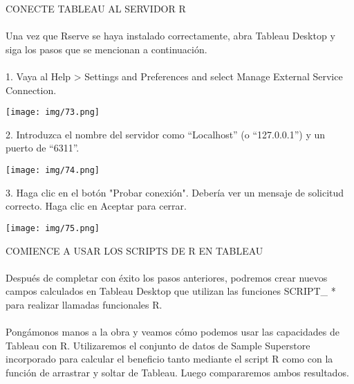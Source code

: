 \documentclass[12pt,letterpaper]{article}
\begin{document}
CONECTE TABLEAU AL SERVIDOR R
\\\\Una vez que Rserve se haya instalado correctamente, abra Tableau Desktop y siga los pasos que se
mencionan a continuación.
\\\\1. Vaya al Help > Settings and Preferences and select Manage External
Service Connection.
\begin{center}
    \texttt{[image: img/73.png]}  
\end{center}
2. Introduzca el nombre del servidor como “Localhost” (o “127.0.0.1”) y un puerto de “6311”.
\begin{center}
    \texttt{[image: img/74.png]}  
\end{center}
3. Haga clic en el botón "Probar conexión". Debería ver un mensaje de solicitud correcto. Haga
clic en Aceptar para cerrar.
\begin{center}
    \texttt{[image: img/75.png]}  
\end{center}

COMIENCE A USAR LOS SCRIPTS DE R EN TABLEAU
\\\\Después de completar con éxito los pasos anteriores, podremos crear nuevos campos calculados en
Tableau Desktop que utilizan las funciones SCRIPT\_ * para realizar llamadas funcionales R.
\\\\Pongámonos manos a la obra y veamos cómo podemos usar las capacidades de Tableau con R.
Utilizaremos el conjunto de datos de Sample Superstore incorporado para calcular el beneficio tanto
mediante el script R como con la función de arrastrar y soltar de Tableau. Luego compararemos ambos
resultados.
\end{document}

